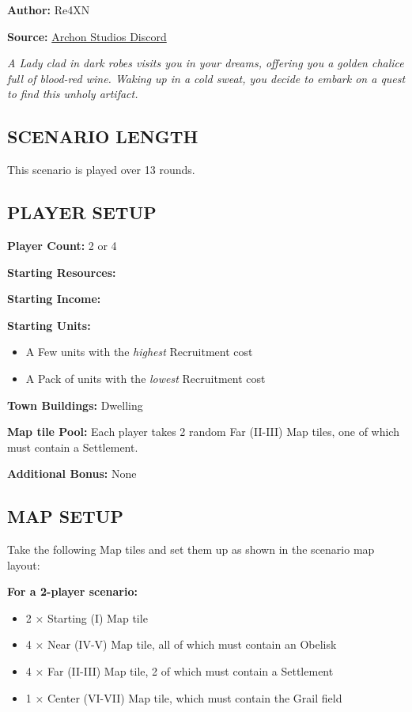 
\begin{multicols*}{2}

\textbf{Author:} Re4XN

\textbf{Source:} \href{https://discord.com/channels/740870068178649108/1239631918643941509}{Archon Studios Discord}

\textit{A Lady clad in dark robes visits you in your dreams, offering you a golden chalice full of blood-red wine. Waking up in a cold sweat, you decide to embark on a quest to find this unholy artifact.}

\subsection*{\MakeUppercase{Scenario Length}}
This scenario is played over 13 rounds.

\subsection*{\MakeUppercase{Player Setup}}
\textbf{Player Count:} 2 or 4

\textbf{Starting Resources:}\par
{}

\textbf{Starting Income:}\par
{}

\textbf{Starting Units:}
\begin{itemize}
  \item A Few  units with the \textit{highest} Recruitment cost
  \item A Pack of  units with the \textit{lowest} Recruitment cost
\end{itemize}

\textbf{Town Buildings:}  Dwelling

\textbf{Map tile Pool:} Each player takes 2 random Far (II-III) Map tiles, one of which must contain a Settlement.

\textbf{Additional Bonus:} None

\subsection*{\MakeUppercase{Map Setup}}
Take the following Map tiles and set them up as shown in the scenario map layout:

\textbf{For a 2-player scenario:}
\begin{itemize}
  \item 2 × Starting (I) Map tile
  \item 4 × Near (IV-V) Map tile, all of which must contain an Obelisk
  \item 4 × Far (II-III) Map tile, 2 of which must contain a Settlement
  \item 1 × Center (VI-VII) Map tile, which must contain the Grail field
\end{itemize}


\end{multicols*}
